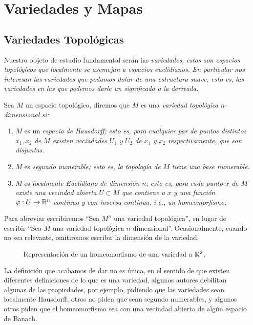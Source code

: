 \chapter{Variedades y Mapas}\label{Capítulo: Variedades y Mapas}
\section{Variedades Topológicas}\label{Sección: Variedades Topologicas}
Nuestro objeto de estudio fundamental serán las \it{variedades}, estos son espacios topológicos que localmente se asemejan a espacios euclidianos. En particular nos interesan las variedades que podamos dotar de una estructura suave, esto es, las variedades en las que podemos darle un significado a la derivada.

\begin{definition}\label{Definición: Variedad Topologica}
	Sea $M$ un espacio topológico, diremos que $M$ es una \it{variedad topológica $n$-dimensional} si:
	\begin{enumerate}
		\item $M$ es un \it{espacio de Hausdorff}; esto es, para cualquier par de puntos distintos $x_1,x_2$ de $M$ existen vecindades $U_1$ y $U_2$ de $x_1$ y $x_2$ respectivamente, que son disjuntas.
		\item $M$ es \it{segundo numerable}; esto es, la topología de $M$ tiene una base numerable.
		\item $M$ es \it{localmente Euclidiano} de dimensión $n$; esto es, para cada punto $x$ de $M$ existe una vecindad abierta $U \subset M$ que contiene a $x$ y una función $\varphi: U \to \mathbb{R}^n$ continua y con inversa continua, i.e., un \it{homeomorfismo}.
	\end{enumerate}
\end{definition}

Para abreviar escribiremos \enquote{Sea $M^n$ una variedad topológica},  en lugar de escribir \enquote{Sea $M$ una variedad topológica $n$-dimensional}. Ocasionalmente, cuando no sea relevante, omitiremos escribir la dimensión de la variedad.

\begin{figure}[h]
	\begin{center}
		
		\caption{Representación de un homeomorfismo de una variedad a $\mathbb{R}^{2}$.}
	\end{center}
\end{figure}

La definición que acabamos de dar no es única, en el sentido de que existen diferentes definiciones de lo que es una variedad, algunos autores debilitan algunas de las propiedades, por ejemplo, pidiendo que las variedades sean localmente Hausdorff, otros no piden que sean segundo numerables, y algunos otros piden que el homeomorfismo sea con una vecindad abierta de algún espacio de Banach.

